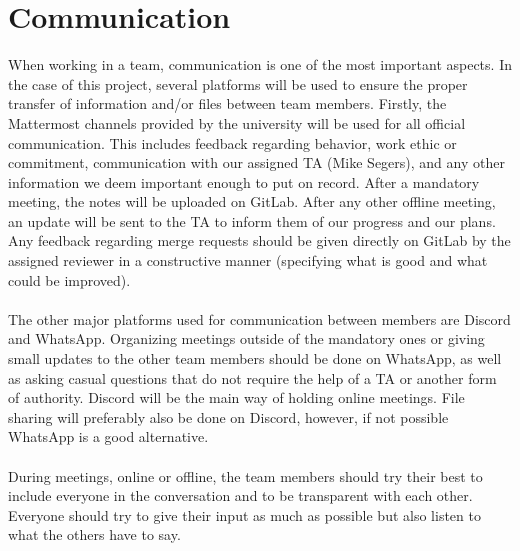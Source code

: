 \section{Communication}
When working in a team, communication is one of the most important aspects. In the case of this project, several platforms will be used to ensure the proper transfer of information and/or files between team members. Firstly, the Mattermost channels provided by the university will be used for all official communication. This includes feedback regarding behavior, work ethic or commitment, communication with our assigned TA (Mike Segers), and any other information we deem important enough to put on record. After a mandatory meeting, the notes will be uploaded on GitLab. After any other offline meeting, an update will be sent to the TA to inform them of our progress and our plans. Any feedback regarding merge requests should be given directly on GitLab by the assigned reviewer in a constructive manner (specifying what is good and what could be improved).
\\\\
The other major platforms used for communication between members are Discord and WhatsApp. Organizing meetings outside of the mandatory ones or giving small updates to the other team members should be done on WhatsApp, as well as asking casual questions that do not require the help of a TA or another form of authority. Discord will be the main way of holding online meetings. File sharing will preferably also be done on Discord, however, if not possible WhatsApp is a good alternative.
\\\\
During meetings, online or offline, the team members should try their best to include everyone in the conversation and to be transparent with each other. Everyone should try to give their input as much as possible but also listen to what the others have to say. 
